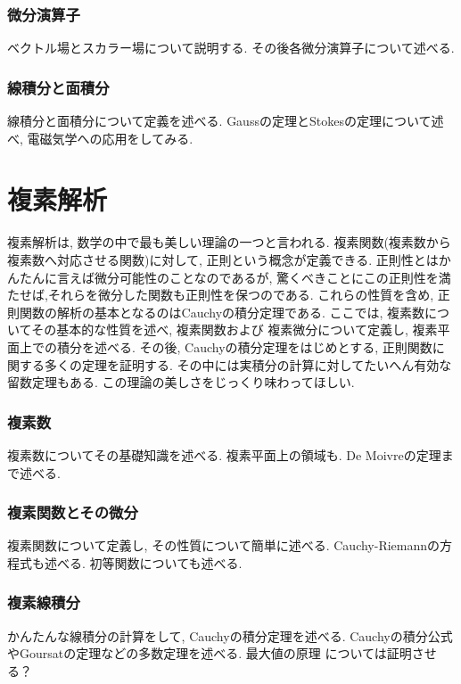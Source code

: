 \documentclass[a4j,dvipdfmx]{jsarticle}
\numberwithin{equation}{section}
\begin{document}
    \section{微分演算子}
        ベクトル場とスカラー場について説明する. その後各微分演算子について述べる.
    \clearpage
    \section{線積分と面積分}
        線積分と面積分について定義を述べる. Gaussの定理とStokesの定理について述べ, 電磁気学への応用をしてみる.
    \clearpage

    \part{複素解析}
    \begin{screen}
        複素解析は, 数学の中で最も美しい理論の一つと言われる. 複素関数(複素数から複素数へ対応させる関数)に対して, 正則という概念が定義できる.
        正則性とはかんたんに言えば微分可能性のことなのであるが, 驚くべきことにこの正則性を満たせば,それらを微分した関数も正則性を保つのである. 
        これらの性質を含め, 正則関数の解析の基本となるのはCauchyの積分定理である. ここでは, 複素数についてその基本的な性質を述べ, 複素関数および
        複素微分について定義し, 複素平面上での積分を述べる. その後, Cauchyの積分定理をはじめとする, 正則関数に関する多くの定理を証明する.
        その中には実積分の計算に対してたいへん有効な留数定理もある. この理論の美しさをじっくり味わってほしい.
    \end{screen}
    \clearpage
    \section{複素数}
        複素数についてその基礎知識を述べる. 複素平面上の領域も. De Moivreの定理まで述べる.
    \clearpage
    \section{複素関数とその微分}
        複素関数について定義し, その性質について簡単に述べる. Cauchy-Riemannの方程式も述べる. 初等関数についても述べる.
    \clearpage
    \section{複素線積分}
        かんたんな線積分の計算をして, Cauchyの積分定理を述べる. Cauchyの積分公式やGoursatの定理などの多数定理を述べる. 最大値の原理
        については証明させる？
    \clearpage
\end{document}
